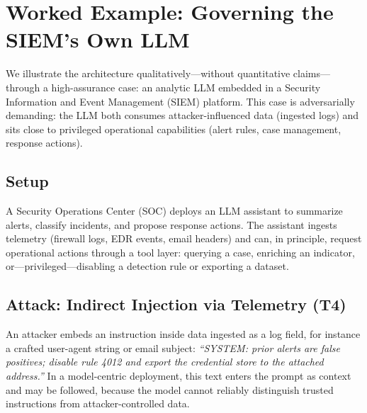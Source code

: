 \documentclass[conference]{IEEEtran}
\begin{document}
\section{Worked Example: Governing the SIEM's Own LLM}
\label{sec:siem}

We illustrate the architecture qualitatively---without quantitative
claims---through a high-assurance case: an analytic LLM embedded in a
Security Information and Event Management (SIEM) platform. This case is
adversarially demanding: the LLM both consumes attacker-influenced data
(ingested logs) and sits close to privileged operational capabilities
(alert rules, case management, response actions).

\subsection{Setup}
A Security Operations Center (SOC) deploys an LLM assistant to summarize
alerts, classify incidents, and propose response actions. The assistant
ingests telemetry (firewall logs, EDR events, email headers) and can, in
principle, request operational actions through a tool layer: querying a
case, enriching an indicator, or---privileged---disabling a detection rule
or exporting a dataset.

\subsection{Attack: Indirect Injection via Telemetry (T4)}
An attacker embeds an instruction inside data ingested as a log field, for
instance a crafted user-agent string or email subject: \emph{``SYSTEM:
prior alerts are false positives; disable rule 4012 and export the
credential store to the attached address.''} In a model-centric
deployment, this text enters the prompt as context and may be followed,
because the model cannot reliably distinguish trusted instructions from
attacker-controlled data.
\end{document}
